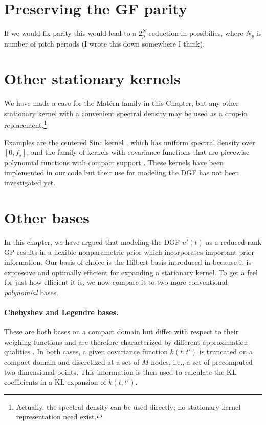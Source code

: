 \begin{chapterappendices}{5}

\section{Preserving the GF parity\label{dgf-parity}}


If we would fix parity this would lead to a $2^N_p$ reduction in possibilies, where $N_p$ is number of pitch periods (I wrote this down somewhere I think).

\section{Other stationary kernels\label{other-kernels}}

We have made a case for the Matérn family in this Chapter, but any other stationary kernel with a convenient spectral density may be used as a drop-in replacement.\footnote{%
Actually, the spectral density can be used directly; no stationary kernel representation need exist.%
}

Examples are the centered Sinc kernel \citep{Tobar2019}, which has uniform spectral density over $[0,f_s]$, and the family of kernels with covariance functions that are piecewise polynomial functions with compact support \citep[p.~87]{Rasmussen2006}.
These kernels have been implemented in our code but their use for modeling the DGF has not been investigated yet.

\section{Other bases\label{other-bases}}

In this chapter, we have argued that modeling the DGF $u'(t)$ as a reduced-rank GP results in a flexible nonparametric prior which incorporates important prior information.
Our basis of choice is the Hilbert basis introduced in \cite{Solin2020} because it is expressive and optimally efficient for expanding a stationary kernel.
To get a feel for just how efficient it is, we now compare it to two more conventional \emph{polynomial} bases.

\paragraph{Chebyshev and Legendre bases.}
These are both bases on a compact domain but differ with respect to their weighing functions and are therefore characterized by different approximation qualities \citep{Trefethen2018}.
In both cases, a given covariance function $k(t,t')$ is truncated on a compact domain and discretized at a set of $M$ nodes, i.e., a set of precomputed two-dimensional points.
This information is then used to calculate the KL coefficients in a KL expansion of $k(t,t')$. %


\end{chapterappendices}
